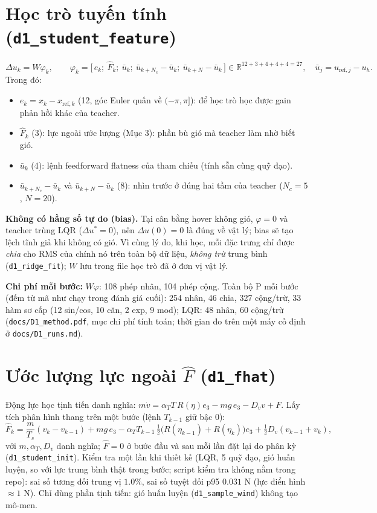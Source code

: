 \documentclass[11pt]{article}
\newcommand{\R}{\mathbb{R}}
\begin{document}
\section{Học trò tuyến tính (\texttt{d1\_student\_feature})}
\[
\Delta u_k = W\varphi_k,\qquad
\varphi_k=\big[\,e_k;\ \hat F_k;\ \bar u_k;\ \bar u_{k+N_c}-\bar u_k;\ \bar u_{k+N}-\bar u_k\,\big]\in\R^{12+3+4+4+4=27},
\quad \bar u_j=u_{\mathrm{ref},j}-u_h .
\]
Trong đó:
\begin{itemize}[leftmargin=1.4em,itemsep=1pt]
\item $e_k=x_k-x_{\mathrm{ref},k}$ (12, góc Euler quấn về $(-\pi,\pi]$): để học trò học được gain phản hồi khác của teacher.
\item $\hat F_k$ (3): lực ngoài ước lượng (Mục 3): phần bù gió mà teacher làm nhờ biết gió.
\item $\bar u_k$ (4): lệnh feedforward flatness của tham chiếu (tính sẵn cùng quỹ đạo).
\item $\bar u_{k+N_c}-\bar u_k$ và $\bar u_{k+N}-\bar u_k$ (8): nhìn trước ở đúng hai tầm của teacher ($N_c{=}5$, $N{=}20$).
\end{itemize}
\textbf{Không có hằng số tự do (bias).} Tại cân bằng hover không gió, $\varphi=0$ và teacher trùng LQR ($\Delta u^*=0$), nên
$\Delta u(0)=0$ là đúng về vật lý; bias sẽ tạo lệch tĩnh giả khi không có gió. Vì cùng lý do, khi học, mỗi đặc trưng chỉ được
\emph{chia} cho RMS của chính nó trên toàn bộ dữ liệu, \emph{không trừ} trung bình (\texttt{d1\_ridge\_fit}); $W$ lưu trong
file học trò đã ở đơn vị vật lý.

\textbf{Chi phí mỗi bước:} $W\varphi$: 108 phép nhân, 104 phép cộng. Toàn bộ P mỗi bước (đếm từ mã như chạy trong đánh giá
cuối): 254 nhân, 46 chia, 327 cộng/trừ, 33 hàm sơ cấp (12 sin/cos, 10 căn, 2 exp, 9 mod); LQR: 48 nhân, 60 cộng/trừ
(\texttt{docs/D1\_method.pdf}, mục chi phí tính toán; thời gian đo trên một máy cố định ở \texttt{docs/D1\_runs.md}).

\section{Ước lượng lực ngoài $\hat F$ (\texttt{d1\_fhat})}
Động lực học tịnh tiến danh nghĩa: $m\dot v=\alpha_T T\,R(\eta)e_3-mg\,e_3-D_v v+F$. Lấy tích phân hình thang trên một bước
(lệnh $T_{k-1}$ giữ bậc 0):
\[
\hat F_k = \frac{m}{T_s}(v_k-v_{k-1}) + mg\,e_3
-\alpha_T T_{k-1}\,\tfrac12\big(R(\eta_{k-1})+R(\eta_k)\big)e_3+\tfrac12D_v(v_{k-1}+v_k),
\]
với $m,\alpha_T,D_v$ danh nghĩa; $\hat F=0$ ở bước đầu và sau mỗi lần đặt lại do phân kỳ (\texttt{d1\_student\_init}).
Kiểm tra một lần khi thiết kế (LQR, 5 quỹ đạo, gió huấn luyện, so với lực trung bình thật trong bước; script kiểm tra không
nằm trong repo): sai số tương đối trung vị $1.0\%$, sai số tuyệt đối p95 $0.031$ N (lực điển hình $\approx1$ N). Chỉ dùng phần
tịnh tiến: gió huấn luyện (\texttt{d1\_sample\_wind}) không tạo mô-men.
\end{document}
